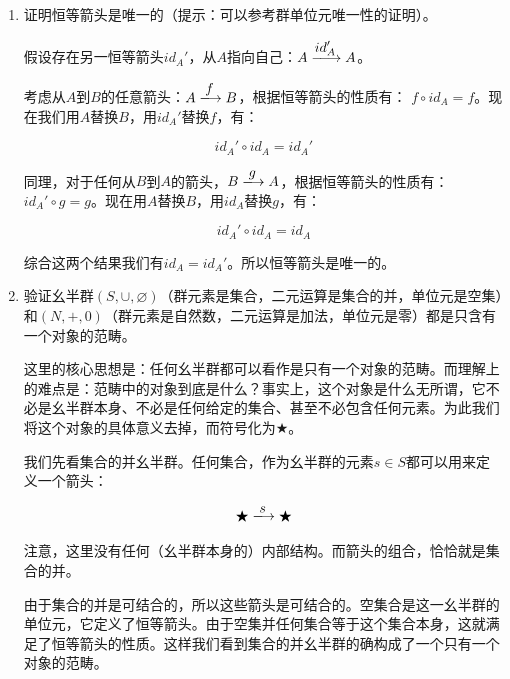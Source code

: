 \documentclass[UTF8]{article}
\begin{document}
\begin{enumerate}
\item {证明恒等箭头是唯一的（提示：可以参考群单位元唯一性的证明）。}

假设存在另一恒等箭头$id_A'$，从$A$指向自己：$A \arrowto{id_A'} A$。

考虑从$A$到$B$的任意箭头：$A \arrowto{f} B$，根据恒等箭头的性质有：
$f \circ id_A = f$。现在我们用$A$替换$B$，用$id_A'$替换$f$，有：

\[
id_A' \circ id_A = id_A'
\]

同理，对于任何从$B$到$A$的箭头，$B \arrowto{g} A$，根据恒等箭头的性质有：
$id_A' \circ g = g$。现在用$A$替换$B$，用$id_A$替换$g$，有：

\[
id_A' \circ id_A = id_A
\]

综合这两个结果我们有$id_A = id_A'$。所以恒等箭头是唯一的。

\item {验证幺半群$(S, \cup, \varnothing)$（群元素是集合，二元运算是集合的并，单位元是空集）和$(N, +, 0)$（群元素是自然数，二元运算是加法，单位元是零）都是只含有一个对象的范畴。}

这里的核心思想是：任何幺半群都可以看作是只有一个对象的范畴。而理解上的难点是：范畴中的对象到底是什么？事实上，这个对象是什么无所谓，它不必是幺半群本身、不必是任何给定的集合、甚至不必包含任何元素。为此我们将这个对象的具体意义去掉，而符号化为$\bigstar$。

我们先看集合的并幺半群。任何集合，作为幺半群的元素$s \in S$都可以用来定义一个箭头：

\[
\bigstar \arrowto{s} \bigstar
\]

注意，这里没有任何（幺半群本身的）内部结构。而箭头的组合，恰恰就是集合的并。

\begin{center}
\end{center}

由于集合的并是可结合的，所以这些箭头是可结合的。空集合是这一幺半群的单位元，它定义了恒等箭头。由于空集并任何集合等于这个集合本身，这就满足了恒等箭头的性质。这样我们看到集合的并幺半群的确构成了一个只有一个对象的范畴。


\end{enumerate}
\end{document}
